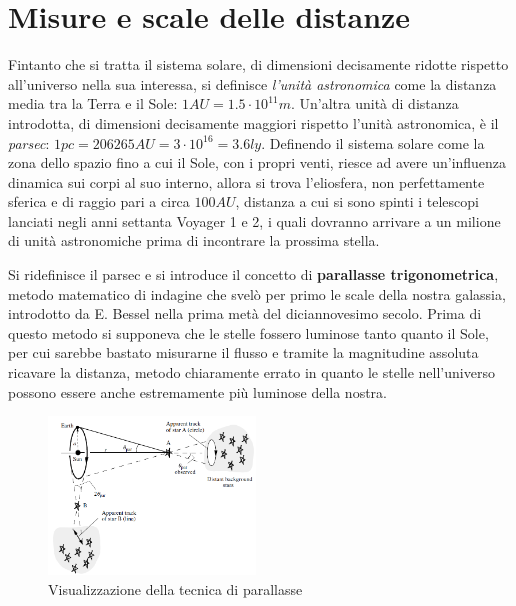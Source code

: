 \documentclass[a4paper,twoside,openany,notitlepage]{book}
\newcommand{\e}[1]{\cdot 10^{#1}}
\theoremstyle{definition}
\theoremstyle{plain}
\begin{document}
\section{Misure e scale delle distanze}

Fintanto che si tratta il sistema solare, di dimensioni decisamente ridotte rispetto all'universo nella sua interessa, si definisce \textit{l'unità astronomica} come la distanza media tra la Terra e il Sole: $1AU=1.5\e{11}m$. Un'altra unità di distanza introdotta, di dimensioni decisamente maggiori rispetto l'unità astronomica, è il \textit{parsec}: $1pc=206265AU=3\e{16}=3.6ly$. Definendo il sistema solare come la zona dello spazio fino a cui il Sole, con i propri venti, riesce ad avere un'influenza dinamica sui corpi al suo interno, allora si trova l'eliosfera, non perfettamente sferica e di raggio pari a circa $100AU$, distanza a cui si sono spinti i telescopi lanciati negli anni settanta Voyager 1 e 2, i quali dovranno arrivare a un milione di unità astronomiche prima di incontrare la prossima stella.

Si ridefinisce il parsec e si introduce il concetto di \textbf{parallasse trigonometrica}, metodo matematico di indagine che svelò per primo le scale della nostra galassia, introdotto da E. Bessel nella prima metà del diciannovesimo secolo. Prima di questo metodo si supponeva che le stelle fossero luminose tanto quanto il Sole, per cui sarebbe bastato misurarne il flusso e tramite la magnitudine assoluta ricavare la distanza, metodo chiaramente errato in quanto le stelle nell'universo possono essere anche estremamente più luminose della nostra.

\begin{figure}
	\vspace{-10pt}
	\centering
	\includegraphics[width=0.49\textwidth]{./Immagini/Capitolo1/parallasse.png}
	\caption*{Visualizzazione della tecnica di parallasse}
	\vspace{-10pt}
\end{figure}
\end{document}
